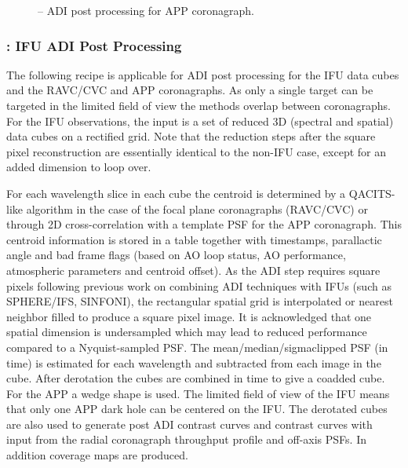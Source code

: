 \begin{figure}[hb]
  \centering
  \def \globalscale {0.400000}
  \fontsize{10}{12}\selectfont
  
  \caption[Recipe: ]{ -- ADI post processing for APP coronagraph.
    }
  \label{fig:metis_lm_adi_app}
\end{figure}
\restoregeometry

\subsubsection{: IFU ADI Post Processing}
\label{sssec:adi_ifu}


The following recipe is applicable for ADI post processing for the IFU
data cubes and the RAVC/CVC and APP coronagraphs. As only a single
target can be targeted in the limited field of view the methods
overlap between coronagraphs.  For the IFU observations, the input is
a set of reduced 3D (spectral and spatial) data cubes on a rectified
grid. Note that the reduction steps after the square pixel reconstruction
are essentially identical to the non-IFU case, except for an added dimension
to loop over. 

For each wavelength slice in each cube the centroid is determined by a
QACITS-like algorithm in the case of the focal plane coronagraphs
(RAVC/CVC) or through 2D cross-correlation with a template PSF for the
APP coronagraph. This centroid information is stored in a table
together with timestamps, parallactic angle and bad frame flags (based
on AO loop status, AO performance, atmospheric parameters and centroid
offset).  As the ADI step requires square pixels following previous
work on combining ADI techniques with IFUs (such as SPHERE/IFS,
SINFONI), the rectangular spatial grid is interpolated or nearest
neighbor filled to produce a square pixel image.  It is acknowledged
that one spatial dimension is undersampled which may lead to reduced
performance compared to a Nyquist-sampled PSF.  The
mean/median/sigmaclipped PSF (in time) is estimated for each
wavelength and subtracted from each image in the cube.  After
derotation the cubes are combined in time to give a coadded cube. For
the APP a wedge shape is used. The limited field of view of the IFU
means that only one APP dark hole can be centered on the IFU. The derotated cubes
are also used to generate post ADI contrast curves and contrast curves
with input from the radial coronagraph throughput profile and off-axis
PSFs. In addition coverage maps are produced.

